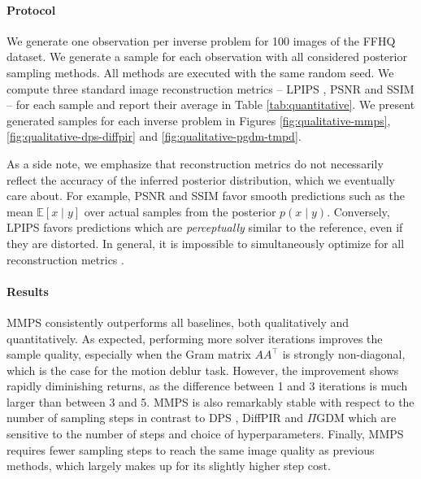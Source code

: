 \begin{subappendices}
\paragraph{Protocol} We generate one observation per inverse problem for 100 images\footnotemark{} of the FFHQ \cite{karras2019stylebased} dataset. We generate a sample for each observation with all considered posterior sampling methods. All methods are executed with the same random seed. We compute three standard image reconstruction metrics -- LPIPS \cite{zhang2018unreasonable}, PSNR and SSIM \cite{wang2004image} -- for each sample and report their average in Table \ref{tab:quantitative}. We present generated samples for each inverse problem in Figures \ref{fig:qualitative-mmps}, \ref{fig:qualitative-dps-diffpir} and \ref{fig:qualitative-pgdm-tmpd}.


As a side note, we emphasize that reconstruction metrics do not necessarily reflect the accuracy of the inferred posterior distribution, which we eventually care about. For example, PSNR and SSIM \cite{wang2004image} favor smooth predictions such as the mean $\mathbb{E}[x \mid y]$ over actual samples from the posterior $p(x \mid y)$. Conversely, LPIPS \cite{zhang2018unreasonable} favors predictions which are \emph{perceptually} similar to the reference, even if they are distorted. In general, it is impossible to simultaneously optimize for all reconstruction metrics \cite{blau2018perceptiondistortion, delbracio2023inversion}.

\paragraph{Results} MMPS consistently outperforms all baselines, both qualitatively and quantitatively. As expected, performing more solver iterations improves the sample quality, especially when the Gram matrix $A A^\top$ is strongly non-diagonal, which is the case for the motion deblur task. However, the improvement shows rapidly diminishing returns, as the difference between 1 and 3 iterations is much larger than between 3 and 5. MMPS is also remarkably stable with respect to the number of sampling steps in contrast to DPS \cite{chung2023diffusion}, DiffPIR \cite{zhu2023denoising} and $\Pi$GDM \cite{song2023pseudoinverseguided} which are sensitive to the number of steps and choice of hyperparameters. Finally, MMPS requires fewer sampling steps to reach the same image quality as previous methods, which largely makes up for its slightly higher step cost.


\end{subappendices}
